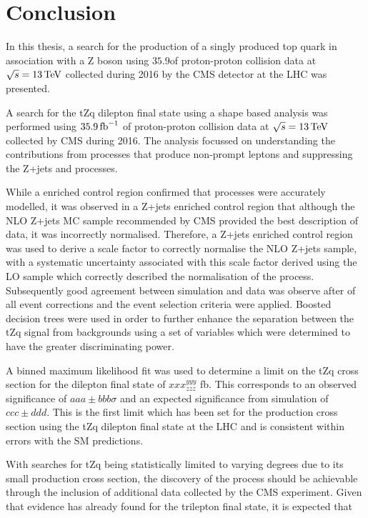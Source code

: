 \chapter{Conclusion}\label{chapter:conclusion}
In this thesis, a search for the production of a singly produced top quark in association with a Z boson using $35.9$\fbinv of proton-proton collision data at $\sqrt{s} = 13\,\text{Te\hspace{-.08em}V}$ collected during 2016 by the CMS detector at the LHC was presented.

A search for the tZq dilepton final state using a shape based analysis was performed using $35.9\mbox{\ensuremath{\,\text{fb}^\text{$-$1}}}$ of proton-proton collision data at $\sqrt{s} = 13\,\text{Te\hspace{-.08em}V}$ collected by CMS during 2016.
The analysis focussed on understanding the contributions from processes that produce non-prompt leptons and suppressing the Z+jets and \ttbar processes.

While a \ttbar enriched control region confirmed that \ttbar processes were accurately modelled, it was observed in a Z+jets enriched control region that although the NLO Z+jets MC sample recommended by CMS provided the best description of data, it was incorrectly normalised.
Therefore, a Z+jets enriched control region was used to derive a scale factor to correctly normalise the NLO Z+jets sample, with a systematic uncertainty associated with this scale factor derived using the LO sample which correctly described the normalisation of the process.
Subsequently good agreement between simulation and data was observe after of all event corrections and the event selection criteria were applied. 
Boosted decision trees were used in order to further enhance the separation between the tZq signal from backgrounds using a set of variables which were determined to have the greater discriminating power.

A binned maximum likelihood fit was used to determine a limit on the tZq cross section for the dilepton final state of $xxx^{yyy}_{zzz}$ fb.
This corresponds to an observed significance of $aaa \pm bbb \sigma$ and an expected significance from simulation of $ccc \pm ddd$. 
This is the first limit which has been set for the production cross section using the tZq dilepton final state at the LHC and is consistent within errors with the SM predictions.

With searches for tZq being statistically limited to varying degrees due to its small production cross section, the discovery of the process should be achievable through the inclusion of additional data collected by the CMS experiment.
Given that evidence has already found for the trilepton final state, it is expected that 

